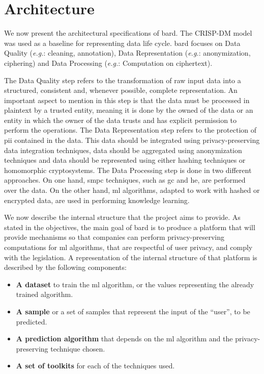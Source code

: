 
\section{Architecture}
\label{sec:Architecture}


We now present the architectural specifications of \ac{bard}. The CRISP-DM model was used as a baseline for representing data life cycle. \ac{bard} focuses on Data Quality (\textit{e.g.}: cleaning, annotation), Data Representation (\textit{e.g.}: anonymization, ciphering) and Data Processing (\textit{e.g.}: Computation on ciphertext).

The Data Quality step refers to the transformation of raw input data into a structured, consistent and, whenever possible, complete representation. An important aspect to mention in this step is that the data must be processed in plaintext by a trusted entity, meaning it is done by the owned of the data or an entity in which the owner of the data trusts and has explicit permission to perform the operations.
The Data Representation step refers to the protection of \ac{pii} contained in the data. This data should be integrated using privacy-preserving data integration techniques, data should be aggregated using anonymization techniques and data should be represented using either hashing techniques or homomorphic cryptosystems.
The Data Processing step is done in two different approaches. On one hand, \ac{smpc} techniques, such as \ac{gc} and \ac{he}, are performed over the data. On the other hand, \ac{ml} algorithms, adapted to work with hashed or encrypted data, are used in performing knowledge learning.

We now describe the internal structure that the project aims to provide.
As stated in the objectives, the main goal of \ac{bard} is to produce a platform that will provide mechanisms so that companies can perform privacy-preserving computations for \ac{ml} algorithms, that are respectful of user privacy, and comply with the legislation. A representation of the internal structure of that platform is described by the following components: 
\begin{itemize}
	\item \textbf{A dataset} to train the \ac{ml} algorithm, or the values representing the already trained algorithm.
	\item \textbf{A sample} or a set of samples that represent the input of the ``user'', to be predicted.
	\item \textbf{A prediction algorithm} that depends on the \ac{ml} algorithm and the privacy-preserving technique chosen.
	\item \textbf{A set of toolkits} for each of the techniques used.
\end{itemize}

